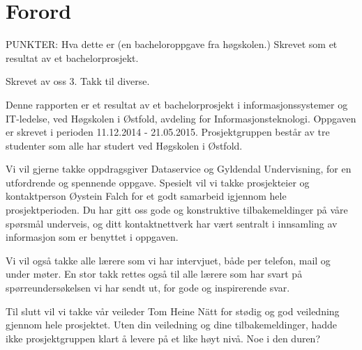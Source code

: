 \cleardoublepage

 \setcounter{page}{-1}
\chapter*{Forord}
{\color{red} PUNKTER: Hva dette er (en bacheloroppgave fra høgskolen.) Skrevet som et resultat av et bachelorprosjekt. 

Skrevet av oss 3. Takk til diverse.} %


Denne rapporten er et resultat av et bachelorprosjekt i informasjonssystemer og IT-ledelse, ved Høgskolen i Østfold, avdeling for Informasjonsteknologi. 
Oppgaven er skrevet i perioden 11.12.2014 - 21.05.2015.	
Prosjektgruppen består av tre studenter som alle har studert ved Høgskolen i Østfold.

Vi vil gjerne takke oppdragsgiver Dataservice og Gyldendal Undervisning, for en utfordrende og spennende oppgave. 
Spesielt vil vi takke prosjekteier og kontaktperson Øystein Falch for et godt samarbeid igjennom hele prosjektperioden. 
Du har gitt oss gode og konstruktive tilbakemeldinger på våre spørsmål underveis, og ditt kontaktnettverk har vært sentralt i innsamling av informasjon som er benyttet i oppgaven.

Vi vil også takke alle lærere som vi har intervjuet, både per telefon, mail og under møter. 
En stor takk rettes også til alle lærere som har svart på spørreundersøkelsen vi har sendt ut, for gode og inspirerende svar.

Til slutt vil vi takke vår veileder Tom Heine Nätt for stødig og god veiledning gjennom hele prosjektet. 
Uten din veiledning og dine tilbakemeldinger, hadde ikke prosjektgruppen klart å levere på et like høyt nivå. {\color{red} Noe i den duren?}


